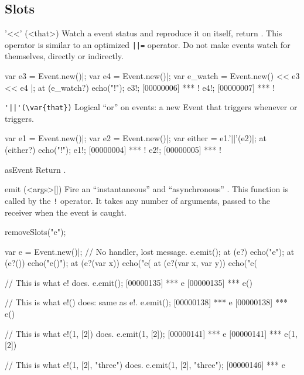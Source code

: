 \subsection{Slots}
\begin{urbiscriptapi}
\item['<<'](<that>)%
  Watch a \that event status and reproduce it on itself, return \this.  This
  operator is similar to an optimized \lstinline,||=, operator.  Do not make
  events watch for themselves, directly or indirectly.

\begin{urbiscript}
var e3 = Event.new()|;
var e4 = Event.new()|;
var e_watch = Event.new() << e3 << e4 |;
at (e_watch?)
  echo("!");
e3!;
[00000006] *** !
e4!;
[00000007] *** !
\end{urbiscript}


\item \lstinline+'||'(\var{that})+%
  Logical ``or'' on events: a new Event that triggers whenever \this or
  \that triggers.

\begin{urbiscript}
var e1 = Event.new()|;
var e2 = Event.new()|;
var either = e1.'||'(e2)|;
at (either?)
  echo("!");
e1!;
[00000004] *** !
e2!;
[00000005] *** !
\end{urbiscript}


\item[asEvent]
  Return \this.


\item[emit](<args>[])%
  Fire an ``instantaneous'' and ``asynchronous'' . This
  function is called by the \lstinline|!| operator.  It takes any number of
  arguments, passed to the receiver when the event is caught.
\begin{urbicomment}
removeSlots("e");
\end{urbicomment}
\begin{urbiscript}
var e = Event.new()|;
// No handler, lost message.
e.emit();
at (e?)               echo("e");
at (e?())             echo("e()");
at (e?(var x))        echo("e(%
at (e?(var x, var y)) echo("e(%

// This is what e! does.
e.emit();
[00000135] *** e
[00000135] *** e()

// This is what e!() does: same as e!.
e.emit();
[00000138] *** e
[00000138] *** e()

// This is what e!(1, [2]) does.
e.emit(1, [2]);
[00000141] *** e
[00000141] *** e(1, [2])

// This is what e!(1, [2], "three") does.
e.emit(1, [2], "three");
[00000146] *** e
\end{urbiscript}


\end{urbiscriptapi}
